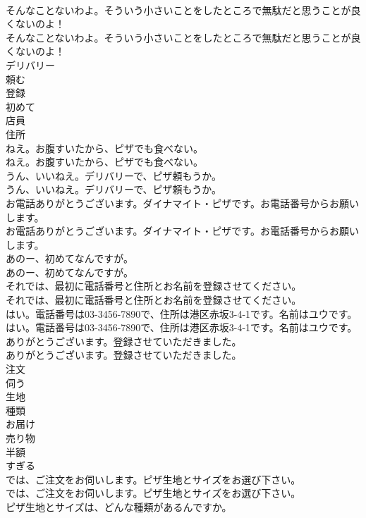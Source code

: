 \documentclass[8pt]{extreport}
\begin{document}
\begin{CJK}{UTF8}{min}
\\	そんなことないわよ。そういう小さいことをしたところで無駄だと思うことが良くないのよ！	
\\	そんなことないわよ。そういう小さいことをしたところで無駄だと思うことが良くないのよ！ 
\\	デリバリー
\\	頼む
\\	登録
\\	初めて
\\	店員
\\	住所
\\	ねえ。お腹すいたから、ピザでも食べない。	
\\	ねえ。お腹すいたから、ピザでも食べない。 
\\	うん、いいねえ。デリバリーで、ピザ頼もうか。	
\\	うん、いいねえ。デリバリーで、ピザ頼もうか。 
\\	お電話ありがとうございます。ダイナマイト・ピザです。お電話番号からお願いします。	
\\	お電話ありがとうございます。ダイナマイト・ピザです。お電話番号からお願いします。 
\\	あのー、初めてなんですが。	
\\	あのー、初めてなんですが。 
\\	それでは、最初に電話番号と住所とお名前を登録させてください。	
\\	それでは、最初に電話番号と住所とお名前を登録させてください。 
\\	はい。電話番号は03-3456-7890で、住所は港区赤坂3-4-1です。名前はユウです。	
\\	はい。電話番号は03-3456-7890で、住所は港区赤坂3-4-1です。名前はユウです。 
\\	ありがとうございます。登録させていただきました。	
\\	ありがとうございます。登録させていただきました。 
\\	注文
\\	伺う
\\	生地
\\	種類
\\	お届け
\\	売り物
\\	半額
\\	すぎる
\\	では、ご注文をお伺いします。ピザ生地とサイズをお選び下さい。	
\\	では、ご注文をお伺いします。ピザ生地とサイズをお選び下さい。 
\\	ピザ生地とサイズは、どんな種類があるんですか。	

\end{CJK}
\end{document}
